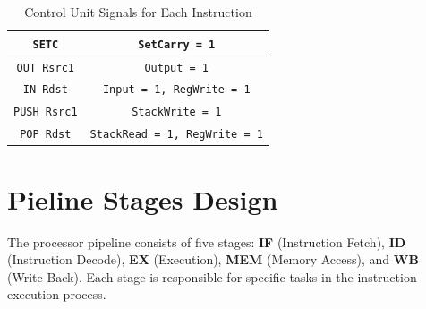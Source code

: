 \documentclass{report}
\begin{document}
\begin{table}[H]
\begin{tabular}{|c|c|}
    \texttt{SETC} & \texttt{SetCarry = 1} \\ \hline
    \texttt{OUT Rsrc1} & \texttt{Output = 1} \\ \hline
    \texttt{IN Rdst} & \texttt{Input = 1, RegWrite = 1} \\ \hline
    \texttt{PUSH Rsrc1} & \texttt{StackWrite = 1} \\ \hline
    \texttt{POP Rdst} & \texttt{StackRead = 1, RegWrite = 1} \\ \hline
    \end{tabular}
    \caption{Control Unit Signals for Each Instruction}
    \label{tab:cu-signals}
\end{table}


\section*{Pieline Stages Design}
The processor pipeline consists of five stages:
\textbf{IF} (Instruction Fetch),
\textbf{ID} (Instruction Decode),
\textbf{EX} (Execution),
\textbf{MEM} (Memory Access), and
\textbf{WB} (Write Back).
Each stage is responsible for specific tasks in the instruction execution process.
\end{document}
